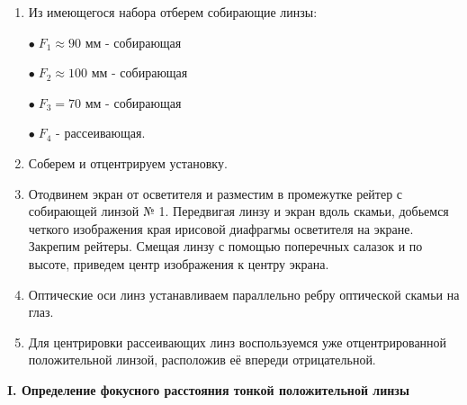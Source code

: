 \documentclass[12pt,a4paper]{article}
\begin{document}
	\begin{enumerate}
		\item Из имеющегося набора отберем собирающие линзы: 
		
		$\bullet \; F_1 \approx 90$ мм - собирающая
		 
		$\bullet \; F_2 \approx 100$ мм - собирающая	

		$\bullet \; F_3 = 70$ мм - собирающая
		
		$\bullet \; F_4$ - рассеивающая.
		
		
		\item Соберем и отцентрируем установку.
		
		\item Отодвинем экран от осветителя и разместим в промежутке рейтер с собирающей линзой № 1. Передвигая линзу и экран вдоль скамьи, добьемся четкого изображения края ирисовой диафрагмы осветителя на экране. Закрепим рейтеры. Смещая линзу с помощью поперечных салазок и по высоте, приведем центр изображения к центру экрана.
		
		\item Оптические оси линз устанавливаем параллельно ребру оптической скамьи на глаз.
		
		\item Для центрировки рассеивающих линз воспользуемся уже отцентрированной положительной линзой, расположив её впереди отрицательной.
		
	\end{enumerate}


	\begin{center}
	\textbf{I. Определение фокусного расстояния тонкой положительной линзы}
	\end{center}
	
\end{document}
